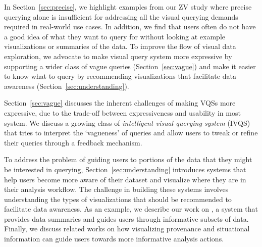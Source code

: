 \par In Section~\ref{sec:precise}, we highlight examples from our ZV study where precise querying alone is insufficient for addressing all the visual querying demands required in real-world use cases. In addition, we find that users often do not have a good idea of what they want to query for without looking at example visualizations or summaries of the data. To improve the flow of visual data exploration, we advocate to make visual query system more expressive by supporting a wider class of vague queries (Section~\ref{sec:vague}) and make it easier to know what to query by recommending visualizations that facilitate data awareness (Section~\ref{sec:understanding}).
\par Section~\ref{sec:vague} discusses the inherent challenges of making VQSs more expressive, due to the trade-off between expressiveness and usability in most system. We discuss a growing class of \textit{intelligent visual querying system} (IVQS) that tries to interpret the `vagueness' of queries and allow users to tweak or refine their queries through a feedback mechanism.
\par To address the problem of guiding users to portions of the data that they might be interested in querying, Section~\ref{sec:understanding} introduces systems that help users become more aware of their dataset and visualize where they are in their analysis workflow. The challenge in building these systems involves understanding the types of visualizations that should be recommended to facilitate data awareness. As an example, we describe our work on \sbd, a system that provides data summaries and guides users through informative subsets of data. Finally, we discuss related works on how visualizing provenance and situational information can guide users towards more informative analysis actions.
